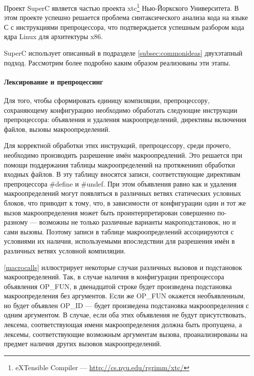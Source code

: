 Проект SuperC является частью проекта xtc\footnote{eXTensible Compiler --- \url{http://cs.nyu.edu/rgrimm/xtc/}} Нью-Йоркского Университета. В этом проекте успешно решается проблема синтаксического анализа кода на языке С с инструкциями препроцессора, что подтверждается успешным разбором кода ядра Linux для архитектуры x86.

SuperC использует описанный в подразделе \ref{subsec:commonideas} двухэтапный подход. Рассмотрим более подробно каким образом реализованы эти этапы.

\paragraph{Лексирование и препроцессинг}
\label{lexingandpreprocessing}

Для того, чтобы сформировать единицу компиляции, препроцессору, сохраняющему конфигурацию необходимо обработать следующие инструкции препроцессора: объявления и удаления макроопределений, директивы включения файлов, вызовы макроопределений.

Для корректной обработки этих инструкций, препроцессору, среди прочего, необходимо производить разрешение имён макроопредлений. Это решается при помощи поддержания таблицы макроопределений на протяжениип обработки входных файлов. В эту таблицу вносятся записи, соответствующие директивам препроцессора \#define и \#undef. При этом объявления равно как и удаления макроопределений могут появляться в различных ветвях статических условных блоков, что приводит к тому, что, в зависимости от конфигурации один и тот же вызов макроопределения может быть проинтерпретирован совершенно по-разному --- возможны не только различные варианты макроподстановок, но и сами вызовы. Поэтому записи в таблице макроопределений ассоциируются с условиями их наличия, используемыми впоследствии для разрешения имён в различных ветвях условной компиляции.

\autoref{macrocalls} иллюстрирует некоторые случаи различных вызовов и подстановок макроопределений. Так, в случае наличия в конфигурации препроцессора объявления OP\_FUN, в двенадцатой строке будет произведена подстановка макроопределения без аргументов. Eсли же OP\_FUN окажется необъявленным, но будет объявлен OP\_ID --- будет произведена подстановка макроопределения с одним аргументом. В случае, если оба этих объявления не будут присутствовать, лексема, соответствующая имени макроопределения должна быть пропущена, а лексемы, соответствующие возможным аргументам вызова, проанализированы на предмет наличия других вызовов макроопределений.

